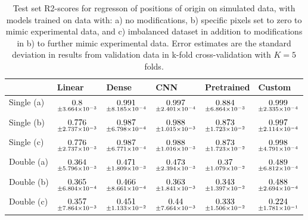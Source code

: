 \begin{table}
\centering
\caption{
Test set R2-scores for regresson of positions of origin on simulated data, with models trained on data with: 
a) no modifications, b) specific pixels set to zero to mimic experimental data, and c) imbalanced dataset
in addition to modifications in b) to further mimic experimental data. Error estimates are the standard deviation 
in results from validation data in k-fold cross-validation with $K=5$ folds.
}
\label{tab:regression-simulated-all-positions-r2}
\begin{tabular}{llllll}
\toprule
{} &                                              Linear &                                               Dense &                                                 CNN &                                          Pretrained &                                              Custom \\
\midrule
Single (a) &  $\underset{\num{+- 3.664e-03 }  }{\num{ 0.8 } }$ &  $\underset{\num{+- 8.185e-04 }  }{\num{ 0.991 } }$ &  $\underset{\num{+- 2.401e-04 }  }{\num{ 0.997 } }$ &  $\underset{\num{+- 6.864e-03 }  }{\num{ 0.884 } }$ &  $\underset{\num{+- 2.335e-04 }  }{\num{ 0.999 } }$ \\
Single (b) &  $\underset{\num{+- 2.737e-03 }  }{\num{ 0.776 } }$ &  $\underset{\num{+- 6.798e-04 }  }{\num{ 0.987 } }$ &  $\underset{\num{+- 1.015e-03 }  }{\num{ 0.988 } }$ &  $\underset{\num{+- 1.723e-02 }  }{\num{ 0.873 } }$ &  $\underset{\num{+- 2.114e-04 }  }{\num{ 0.997 } }$ \\
Single (c) &  $\underset{\num{+- 2.737e-03 }  }{\num{ 0.776 } }$ &  $\underset{\num{+- 6.771e-04 }  }{\num{ 0.987 } }$ &  $\underset{\num{+- 1.016e-03 }  }{\num{ 0.988 } }$ &  $\underset{\num{+- 1.723e-02 }  }{\num{ 0.873 } }$ &  $\underset{\num{+- 4.791e-04 }  }{\num{ 0.998 } }$ \\
Double (a) &  $\underset{\num{+- 5.796e-03 }  }{\num{ 0.364 } }$ &  $\underset{\num{+- 1.809e-03 }  }{\num{ 0.471 } }$ &  $\underset{\num{+- 2.394e-03 }  }{\num{ 0.473 } }$ &  $\underset{\num{+- 1.079e-02 }  }{\num{ 0.37 } }$ &  $\underset{\num{+- 6.812e-04 }  }{\num{ 0.489 } }$ \\
Double (b) &  $\underset{\num{+- 6.804e-04 }  }{\num{ 0.365 } }$ &  $\underset{\num{+- 8.661e-04 }  }{\num{ 0.466 } }$ &  $\underset{\num{+- 1.841e-03 }  }{\num{ 0.363 } }$ &  $\underset{\num{+- 1.397e-02 }  }{\num{ 0.343 } }$ &  $\underset{\num{+- 2.694e-04 }  }{\num{ 0.488 } }$ \\
Double (c) &  $\underset{\num{+- 7.864e-03 }  }{\num{ 0.357 } }$ &  $\underset{\num{+- 1.133e-02 }  }{\num{ 0.451 } }$ &  $\underset{\num{+- 7.664e-03 }  }{\num{ 0.44 } }$ &  $\underset{\num{+- 1.506e-02 }  }{\num{ 0.333 } }$ &  $\underset{\num{+- 1.781e-01 }  }{\num{ 0.224 } }$ \\
\bottomrule
\end{tabular}
\end{table}
